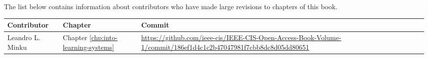 
\contributors

The list below contains information about contributors who have made large revisions to chapters of this book.

\begin{center}
\begin{tabularx}{1.2\textwidth}{|l|l|X|} \hline
Contributor & Chapter & Commit \\ \hline
Leandro L. Minku & Chapter \ref{chp:into-learning-systems} & \url{https://github.com/ieee-cis/IEEE-CIS-Open-Access-Book-Volume-1/commit/186ef1d4c1c2b47047981f7cbb8dc8d05dd80651} \\ \hline
\end{tabularx}
\end{center}